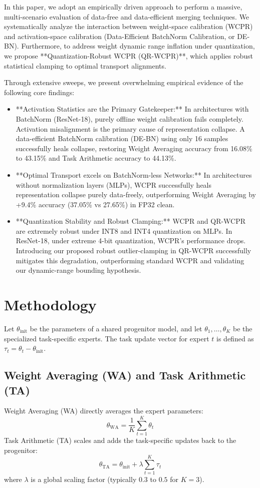 \documentclass{article}
\theoremstyle{plain}
\theoremstyle{definition}
\theoremstyle{remark}
\begin{document}
In this paper, we adopt an empirically driven approach to perform a massive, multi-scenario evaluation of data-free and data-efficient merging techniques. We systematically analyze the interaction between weight-space calibration (WCPR) and activation-space calibration (Data-Efficient BatchNorm Calibration, or DE-BN). Furthermore, to address weight dynamic range inflation under quantization, we propose **Quantization-Robust WCPR (QR-WCPR)**, which applies robust statistical clamping to optimal transport alignments. 

Through extensive sweeps, we present overwhelming empirical evidence of the following core findings:
\begin{itemize}
    \item **Activation Statistics are the Primary Gatekeeper:** In architectures with BatchNorm (ResNet-18), purely offline weight calibration fails completely. Activation misalignment is the primary cause of representation collapse. A data-efficient BatchNorm calibration (DE-BN) using only 16 samples successfully heals collapse, restoring Weight Averaging accuracy from 16.08\% to 43.15\% and Task Arithmetic accuracy to 44.13\%.
    \item **Optimal Transport excels on BatchNorm-less Networks:** In architectures without normalization layers (MLPs), WCPR successfully heals representation collapse purely data-freely, outperforming Weight Averaging by +9.4\% accuracy (37.05\% vs 27.65\%) in FP32 clean.
    \item **Quantization Stability and Robust Clamping:** WCPR and QR-WCPR are extremely robust under INT8 and INT4 quantization on MLPs. In ResNet-18, under extreme 4-bit quantization, WCPR's performance drops. Introducing our proposed robust outlier-clamping in QR-WCPR successfully mitigates this degradation, outperforming standard WCPR and validating our dynamic-range bounding hypothesis.
\end{itemize}

\section{Methodology}
Let $\theta_{\text{init}}$ be the parameters of a shared progenitor model, and let $\theta_1, \dots, \theta_K$ be the specialized task-specific experts. The task update vector for expert $t$ is defined as $\tau_t = \theta_t - \theta_{\text{init}}$.

\subsection{Weight Averaging (WA) and Task Arithmetic (TA)}
Weight Averaging (WA) directly averages the expert parameters:
\begin{equation}
    \theta_{\text{WA}} = \frac{1}{K} \sum_{t=1}^K \theta_t
\end{equation}
Task Arithmetic (TA) scales and adds the task-specific updates back to the progenitor:
\begin{equation}
    \theta_{\text{TA}} = \theta_{\text{init}} + \lambda \sum_{t=1}^K \tau_t
\end{equation}
where $\lambda$ is a global scaling factor (typically $0.3$ to $0.5$ for $K=3$).
\end{document}
